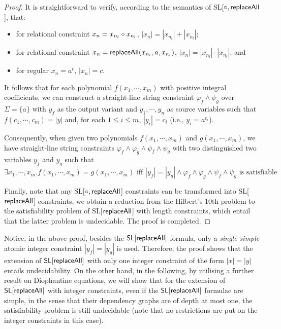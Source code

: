 \begin{proof}
{It is straightforward to verify, according to the semantics of SL[$\circ, \mathsf{replaceAll}$], that:
\begin{itemize}
	\item for relational constraint $x_n= x_{n_l}\circ x_{n_l}$, $|x_n|= |x_{n_l}|+|x_{n_l}|$; 
	\item for relational constraint $x_n= \mathsf{replaceAll}(x_{n_l}, a, x_{n_l})$,  $|x_n|= |x_{n_l}|\cdot |x_{n_l}|$; and 
	\item for regular $x_n=a^c$, $|x_n|=c$. 
\end{itemize}

It follows that for each polynomial $f(x_1, \cdots, x_m)$ with positive integral coefficients, we can construct a straight-line string constraint $\varphi_{f}\wedge\psi_g$ over $\Sigma=\{a\}$ with $y_f$ as the output variant and $y_1, \cdots, y_n$ as source variables such that
$f(c_1, \cdots, c_m)=|y|$ and, for each $1\leq i\leq m$, $|y_i|= c_i$ (i.e., $y_i=a^{c_i}$).  

Consequently, when given two polynomials $f(x_1, \cdots, x_m)$ and $g(x_1, \cdots, x_m)$, we have straight-line string constraints $\varphi_{f}\wedge \varphi_{g}\wedge \psi_{f}\wedge \psi_g$ with two distinguished two variables  $y_f$ and $y_g$ such that  
\[\exists x_1, \cdots, x_m. f(x_1, \cdots, x_m)=g(x_1, \cdots, x_m)\mbox{ iff } |y_f|=|y_g|\wedge \varphi_{f}\wedge \varphi_{g}\wedge \psi_{f}\wedge \psi_g\mbox{ is satisfiable} \]

Finally, note that any  SL[$\circ, \mathsf{replaceAll}$] constraints can be transformed into SL[$\mathsf{replaceAll}$] constraints, we obtain a reduction from the Hilbert's 10th problem to the satisfiability problem of  SL[$\mathsf{replaceAll}$] with length constraints, which entail that the latter problem is undecidable. The proof is completed. 
}
\end{proof}

Notice, in the above proof, besides the $\mathsf{SL}[\mathsf{replaceAll}]$ formula, only a \emph{single simple} atomic integer constraint $|y_f| = |y_g|$ is used. Therefore, the proof  shows that the extension of $\mathsf{SL}[\mathsf{replaceAll}]$ with only one integer constraint of the form $|x| = |y|$ entails undecidability.
On the other hand, in the following, by utilising a further result on Diophantine equations, we will show that for the extension of $\mathsf{SL}[\mathsf{replaceAll}]$ with integer constraints, even if the $\mathsf{SL}[\mathsf{replaceAll}]$ formulae are simple, in the sense that their dependency graphs are of depth at most one, the satisfiability problem is still undecidable (note that no restrictions are put on the integer constraints in this case).

